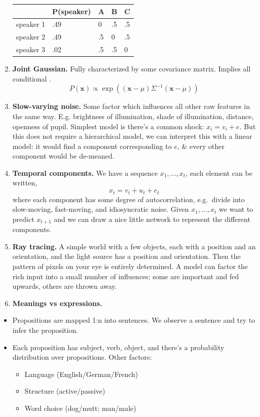 \documentclass[
  11pt,
  letterpaper,
  DIV=11,
  numbers=noendperiod,
  oneside]{scrartcl}
\providecommand{\tightlist}{%
  \setlength{\itemsep}{0pt}\setlength{\parskip}{0pt}}\usepackage{longtable,booktabs,array}
\begin{document}
\begin{enumerate}
  \begin{longtable}[]{@{}lllll@{}}
  \toprule\noalign{}
  & P(speaker) & A & B & C \\
  \midrule\noalign{}
  \endhead
  \bottomrule\noalign{}
  \endlastfoot
  speaker 1 & .49 & 0 & .5 & .5 \\
  speaker 2 & .49 & .5 & 0 & .5 \\
  speaker 3 & .02 & .5 & .5 & 0 \\
  \end{longtable}
\item
  \textbf{Joint Gaussian.} Fully characterized by some covariance
  matrix. Implies all conditional .
  \[P(\bm{x})\propto \exp\left( (\bm{x}-\mu)\Sigma^{-1}(\bm{x}-\mu) \right)\]
\item
  \textbf{Slow-varying noise.} Some factor which influences all other
  raw features in the same way. E.g. brightness of illumination, shade
  of illumination, distance, openness of pupil. Simplest model is
  there's a common shock: \(x_i = v_i + e\). But this does not require a
  hierarchical model, we can interpret this with a linear model: it
  would find a component corresponding to \(e\), \& every other
  component would be de-meaned.
\item
  \textbf{Temporal components.} We have a sequence \(x_1,\ldots,x_t\),
  each element can be written, \[x_t = v_t + u_t + e_t\] where each
  component has some degree of autocorrelation, e.g.~divide into
  slow-moving, fast-moving, and idiosyncratic noise. Given
  \(x_1,\ldots,x_t\) we want to predict \(x_{t+1}\) and we can draw a
  nice little network to represent the different components.
\item
  \textbf{Ray tracing.} A simple world with a few objects, each with a
  position and an orientation, and the light source has a position and
  orientation. Then the pattern of pixels on your eye is entirely
  determined. A model can factor the rich input into a small number of
  influences; some are important and fed upwards, others are thrown
  away.
\item
  \textbf{Meanings vs expressions.}
\end{enumerate}

\begin{itemize}
\tightlist
\item
  Propositions are mapped 1:n into sentences. We observe a sentence and
  try to infer the proposition.
\item
  Each proposition has subject, verb, object, and there's a probability
  distribution over propositions. Other factors:

  \begin{itemize}
  \tightlist
  \item
    Language (English/German/French)
  \item
    Structure (active/passive)
  \item
    Word choice (dog/mutt; man/male)
  \end{itemize}
\end{itemize}
\end{document}
